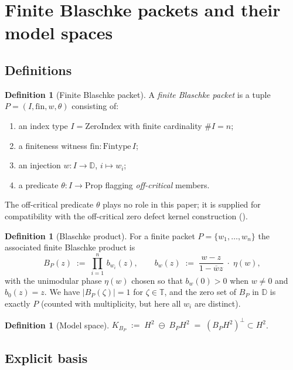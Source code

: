 \documentclass[12pt]{article}
\theoremstyle{definition}
\newtheorem{definition}[theorem]{Definition}
\theoremstyle{remark}
\newcommand{\D}{\mathbb{D}}
\newcommand{\T}{\mathbb{T}}
\newcommand{\HHH}{H^{2}}
\newcommand{\KBP}{K_{B_{P}}}
\newcommand{\abs}[1]{\lvert #1 \rvert}
\newcommand{\conj}[1]{\overline{#1}}
\begin{document}
\section{Finite Blaschke packets and their model spaces}\label{sec:packets}

\subsection{Definitions}

\begin{definition}[Finite Blaschke packet]\label{def:packet}
A \emph{finite Blaschke packet} is a tuple
$P=(I,\mathrm{fin},w,\theta)$ consisting of:
\begin{enumerate}\itemsep0pt
  \item an index type $I=\mathrm{ZeroIndex}$ with finite cardinality $\#I=n$;
  \item a finiteness witness $\mathrm{fin}:\mathrm{Fintype}\,I$;
  \item an injection $w:I\to\D$, $i\mapsto w_{i}$;
  \item a predicate $\theta:I\to\mathrm{Prop}$ flagging \emph{off-critical}
        members.
\end{enumerate}
\end{definition}

The off-critical predicate $\theta$ plays no role in this paper; it is
supplied for compatibility with the off-critical zero defect kernel
construction (\cite[Paper~03]{Vol6KB}).

\begin{definition}[Blaschke product]\label{def:blaschke-prod}
For a finite packet $P=\{w_{1},\dots,w_{n}\}$ the associated finite
Blaschke product is
\[
  B_{P}(z)\;:=\;\prod_{i=1}^{n}\,b_{w_{i}}(z),\qquad
  b_{w}(z)\;:=\;\frac{w-z}{1-\conj{w}z}\;\cdot\;\eta(w),
\]
with the unimodular phase $\eta(w)$ chosen so that $b_{w}(0)>0$ when
$w\neq0$ and $b_{0}(z)=z$. We have $\abs{B_{P}(\zeta)}=1$ for
$\zeta\in\T$, and the zero set of $B_{P}$ in $\D$ is exactly $P$
(counted with multiplicity, but here all $w_{i}$ are distinct).
\end{definition}

\begin{definition}[Model space]\label{def:model-space}
$\KBP\;:=\;\HHH\;\ominus\;B_{P}\HHH\;=\;(B_{P}\HHH)^{\perp}\subset\HHH$.
\end{definition}

\subsection{Explicit basis}
\end{document}
